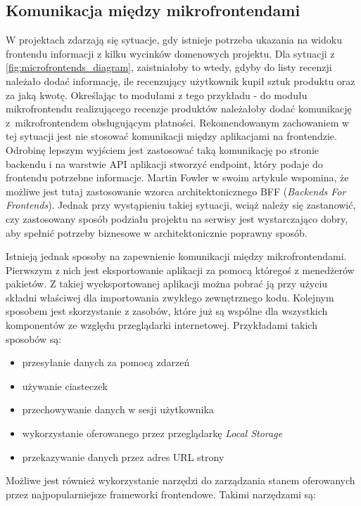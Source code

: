 \documentclass{SGGW-thesis}
\begin{document}
\subsection{Komunikacja między mikrofrontendami}
W projektach zdarzają się sytuacje, gdy istnieje potrzeba ukazania na widoku frontendu informacji z kilku wycinków domenowych projektu. Dla sytuacji z  \cref{fig:microfrontends_diagram}, zaistniałoby to wtedy, gdyby do listy recenzji należało dodać informację, ile recenzujący użytkownik kupił sztuk produktu oraz za jaką kwotę. Określając to modułami z tego przykładu - do modułu mikrofrontendu realizującego recenzje produktów należałoby dodać komunikację z~mikrofrontendem obsługującym płatności. Rekomendowanym  zachowaniem w tej sytuacji jest nie stosować komunikacji między aplikacjami na frontendzie. Odrobinę lepszym wyjściem jest zastosować taką komunikację po stronie backendu i na warstwie API aplikacji stworzyć endpoint, który podaje do frontendu potrzebne informacje. Martin Fowler w swoim artykule \cite{fowler_2019} wspomina, że możliwe jest tutaj zastosowanie wzorca architektonicznego BFF (\textit{Backends For Frontends}). Jednak przy wystąpieniu takiej sytuacji, wciąż należy się zastanowić, czy zastosowany sposób podziału projektu na serwisy jest wystarczająco dobry, aby spełnić potrzeby biznesowe w architektonicznie poprawny sposób.

Istnieją jednak sposoby na zapewnienie komunikacji między mikrofrontendami. Pierwszym z nich jest eksportowanie aplikacji za pomocą któregoś z menedżerów pakietów. Z takiej wyeksportowanej aplikacji można pobrać ją przy użyciu składni właściwej dla importowania zwykłego zewnętrznego kodu.
Kolejnym sposobem jest skorzystanie z zasobów, które już są wspólne dla wszystkich komponentów ze względu przeglądarki internetowej. Przykładami takich sposobów są:

\begin{itemize}
  \item przesyłanie danych za pomocą zdarzeń
  \item używanie ciasteczek
  \item przechowywanie danych w sesji użytkownika
  \item wykorzystanie oferowanego przez przeglądarkę \textit{Local Storage}
  \item przekazywanie danych przez adres URL strony
\end{itemize}

Możliwe jest również wykorzystanie narzędzi do zarządzania stanem oferowanych przez najpopularniejsze frameworki frontendowe. Takimi narzędzami są:
\end{document}
